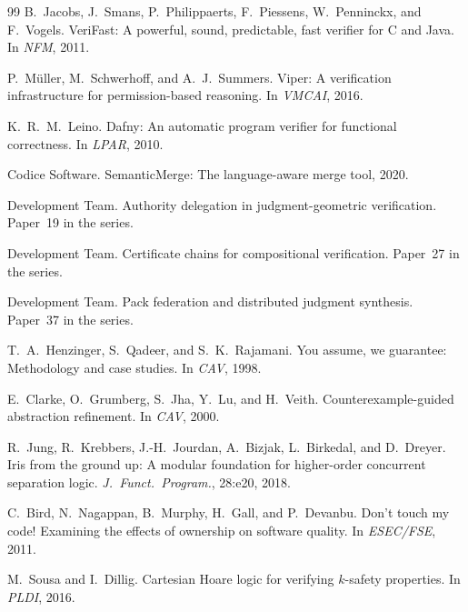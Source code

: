 \documentclass[11pt]{article}
\begin{document}

\begin{thebibliography}{99}
B.~Jacobs, J.~Smans, P.~Philippaerts, F.~Piessens, W.~Penninckx, and
F.~Vogels.
\newblock VeriFast: A powerful, sound, predictable, fast verifier for C and
Java.
\newblock In \emph{NFM}, 2011.

P.~M{\"u}ller, M.~Schwerhoff, and A.~J.~Summers.
\newblock Viper: A verification infrastructure for permission-based reasoning.
\newblock In \emph{VMCAI}, 2016.

K.~R.~M.~Leino.
\newblock Dafny: An automatic program verifier for functional correctness.
\newblock In \emph{LPAR}, 2010.

Codice Software.
\newblock Semantic{M}erge: The language-aware merge tool, 2020.

\JuGeo{} Development Team.
\newblock Authority delegation in judgment-geometric verification.
\newblock Paper~19 in the \JuGeo{} series.

\JuGeo{} Development Team.
\newblock Certificate chains for compositional verification.
\newblock Paper~27 in the \JuGeo{} series.

\JuGeo{} Development Team.
\newblock Pack federation and distributed judgment synthesis.
\newblock Paper~37 in the \JuGeo{} series.

T.~A.~Henzinger, S.~Qadeer, and S.~K.~Rajamani.
\newblock You assume, we guarantee: Methodology and case studies.
\newblock In \emph{CAV}, 1998.

E.~Clarke, O.~Grumberg, S.~Jha, Y.~Lu, and H.~Veith.
\newblock Counterexample-guided abstraction refinement.
\newblock In \emph{CAV}, 2000.

R.~Jung, R.~Krebbers, J.-H.~Jourdan, A.~Bizjak, L.~Birkedal, and
D.~Dreyer.
\newblock Iris from the ground up: A modular foundation for higher-order
concurrent separation logic.
\newblock \emph{J.~Funct.~Program.}, 28:e20, 2018.

C.~Bird, N.~Nagappan, B.~Murphy, H.~Gall, and P.~Devanbu.
\newblock Don't touch my code! {E}xamining the effects of ownership on
software quality.
\newblock In \emph{ESEC/FSE}, 2011.

M.~Sousa and I.~Dillig.
\newblock Cartesian {H}oare logic for verifying $k$-safety properties.
\newblock In \emph{PLDI}, 2016.


\end{thebibliography}
\end{document}
